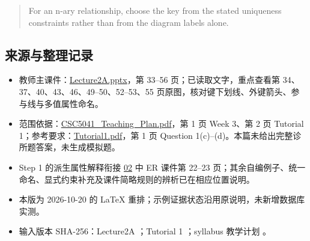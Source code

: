\begin{quote}
For an n-ary relationship, choose the key from the stated uniqueness constraints rather than from the diagram labels alone.
\end{quote}

\subsection{来源与整理记录}\label{04_er_to_relational_mapping_zh-ux6765ux6e90ux4e0eux6574ux7406ux8bb0ux5f55}

\begin{itemize}
\tightlist
\item
  教师主课件：\href{../../../slides/Lecture2A.pptx}{Lecture2A.pptx}，第 33--56 页；已读取文字，重点查看第 34、37、40、43、46、49--50、52--53、55 页原图，核对键下划线、外键箭头、参与线与多值属性命名。
\item
  范围依据：\href{../../../syllabus/CSC5041_Teaching_Plan.pdf}{CSC5041\_Teaching\_Plan.pdf}，第 1 页 Week 3、第 2 页 Tutorial 1；参考要求：\href{../../../slides/Tutorial1.pdf}{Tutorial1.pdf}，第 1 页 Question 1(c)--(d)。本篇未给出完整诊所题答案，未生成模拟题。
\item
  Step 1 的派生属性解释衔接 \hyperref[02_er_modelling_zh]{02} 中 ER 课件第 22--23 页；其余自编例子、统一命名、显式约束补充及课件简略规则的辨析已在相应位置说明。
\item
  本版为 2026-10-20 的 LaTeX 重排；示例证据状态沿用原说明，未新增数据库实测。
\item
  输入版本 SHA-256：Lecture2A \texttt{}；Tutorial 1 \texttt{}；syllabus 教学计划 \texttt{}。
\end{itemize}

